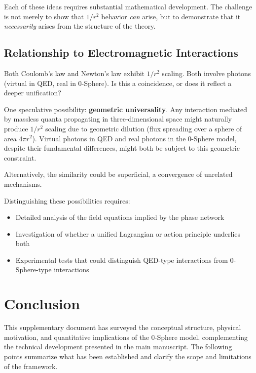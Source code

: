 \documentclass[12pt,letterpaper]{article}
\begin{document}
Each of these ideas requires substantial mathematical development. The challenge is not merely to show that $1/r^2$ behavior \textit{can} arise, but to demonstrate that it \textit{necessarily} arises from the structure of the theory.


\subsection{Relationship to Electromagnetic Interactions}
\label{subsec:em_relationship}

Both Coulomb's law and Newton's law exhibit $1/r^2$ scaling. Both involve photons (virtual in QED, real in 0-Sphere). Is this a coincidence, or does it reflect a deeper unification?

One speculative possibility: \textbf{geometric universality}. Any interaction mediated by massless quanta propagating in three-dimensional space might naturally produce $1/r^2$ scaling due to geometric dilution (flux spreading over a sphere of area $4\pi r^2$). Virtual photons in QED and real photons in the 0-Sphere model, despite their fundamental differences, might both be subject to this geometric constraint.

Alternatively, the similarity could be superficial, a convergence of unrelated mechanisms.

Distinguishing these possibilities requires:
\begin{itemize}
\item Detailed analysis of the field equations implied by the phase network
\item Investigation of whether a unified Lagrangian or action principle underlies both
\item Experimental tests that could distinguish QED-type interactions from 0-Sphere-type interactions
\end{itemize}


\section{Conclusion}
\label{sec:conclusion}

\justifying

This supplementary document has surveyed the conceptual structure, physical motivation, and quantitative implications of the 0-Sphere model, complementing the technical development presented in the main manuscript. The following points summarize what has been established and clarify the scope and limitations of the framework.
\end{document}
